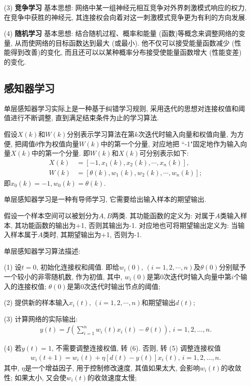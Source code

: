  (3) \textbf{竞争学习} 基本思想: 网络中某一组神经元相互竞争对外界刺激模式响应的权力, 在竞争中获胜的神经元, 其连接权会向着对这一刺激模式竞争更为有利的方向发展.

 (4) \textbf{随机学习} 基本思想: 结合随机过程、概率和能量 (函数)等概念来调整网络的变量, 从而使网络的目标函数达到最大 (或最小). 他不仅可以接受能量函数减少 (性能得到改善)的变化, 而且还可以以某种概率分布接受使能量函数增大 (性能变差)的变化.
\subsection{感知器学习}

单层感知器学习实际上是一种基于纠错学习规则, 采用迭代的思想对连接权值和阈值进行不断调整, 直到满足结束条件为止的学习算法.

假设$X (k)$和$W(k)$分别表示学习算法在第$k$次迭代时输入向量和权值向量, 为方便, 把阈值$\theta$作为权值向量$W (k)$中的第一个分量, 对应地把 ``-1"固定地作为输入向量$X (k)$中的第一个分量. 即$W (k)$和$X (k)$可分别表示如下:
\begin{align}
    X (k)&=[-1, x_1 (k), x_2 (k),\cdots, x_n (k)],\\
    W (k)&=[\theta (k),w_1 (k), w_2 (k),\cdots,w_n (k)];
\end{align}
即$x_0 (k)=-1, w_0 (k)=\theta  (k)$.

单层感知器学习是一种有导师学习, 它需要给出输入样本的期望输出.

假设一个样本空间可以被划分为$A, B$两类. 其功能函数的定义为: 对属于$A$类输入样本, 其功能函数的输出为+1, 否则其输出为-1. 对应地也可将期望输出定义为: 当输入样本属于$A$类时, 其期望输出为+1, 否则为-1.

单层感知器学习算法描述:

 (1) 设$t=0$, 初始化连接权和阈值. 即给$w_i (0),\, (i=1, 2, \cdots,n)$及$\theta (0)$分别赋予一个较小的非零随机数, 作为初值, 其中, $w_i (0)$是第0次迭代时输入向量中第$i$个输入的连接权值; $\theta (0)$是第0次迭代时输出节点的阈值;

 (2) 提供新的样本输入$x_i (t),\, (i=1, 2,\cdots, n)$和期望输出$d (t)$;

 (3) 计算网络的实际输出:
        \begin{align}
            y (t)=f\left (\sum_{i=1}^{n} w_{i} (t) x_{i} (t)-\theta (t)\right),\, i=1,2, \ldots, n.
        \end{align}

 (4) 若$y (t)=1$, 不需要调整连接权值, 转 (6). 否则, 转 (5) 调整连接权值
        \begin{align}
            w_{i} (t+1)=w_{i} (t)+\eta[d (t)-y (t)] x_{i} (t),\,  i=1,2, \ldots, n.
        \end{align}
        其中, $\eta$是一个增益因子, 用于控制修改速度, 其值如果太大, 会影响$w_i (t)$的收敛性; 如果太小, 又会使$w_i (t)$的收敛速度太慢;

